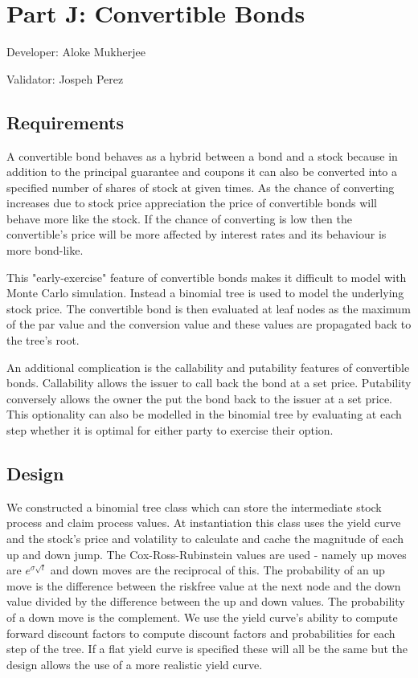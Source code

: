 \chapter{Part J: Convertible Bonds}
Developer: Aloke Mukherjee

\noindent Validator: Jospeh Perez



\section{Requirements}

A convertible bond behaves as a hybrid between a bond and a stock
because in addition to the principal guarantee and coupons it can
also be converted into a specified number of shares of stock at
given times.  As the chance of converting increases due to stock
price appreciation the price of convertible bonds will behave more
like the stock.  If the chance of converting is low then the
convertible's price will be more affected by interest rates and its
behaviour is more bond-like.

This "early-exercise" feature of convertible bonds makes it
difficult to model with Monte Carlo simulation.  Instead a binomial
tree is used to model the underlying stock price.  The convertible
bond is then evaluated at leaf nodes as the maximum of the par value
and the conversion value and these values are propagated back to the
tree's root.

An additional complication is the callability and putability
features of convertible bonds.  Callability allows the issuer to
call back the bond at a set price.  Putability conversely allows the
owner the put the bond back to the issuer at a set price.  This
optionality can also be modelled in the binomial tree by evaluating
at each step whether it is optimal for either party to exercise
their option.

\section{Design }

We constructed a binomial tree class which can store the
intermediate stock process and claim process values.  At
instantiation this class uses the yield curve and the stock's price
and volatility to calculate and cache the magnitude of each up and
down jump. The Cox-Ross-Rubinstein values are used - namely up moves
are $e^{\sigma\surd t}$ and down moves are the reciprocal of this.
The probability of an up move is the difference between the riskfree
value at the next node and the down value divided by the difference
between the up and down values.  The probability of a down move is
the complement.  We use the yield curve's ability to compute forward
discount factors to compute discount factors and probabilities for
each step of the tree.  If a flat yield curve is specified these
will all be the same but the design allows the use of a more
realistic yield curve.

